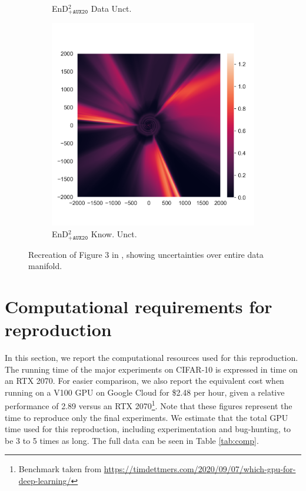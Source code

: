 \begin{figure}
\begin{subfigure}{0.22\textwidth}
  \caption{EnD$^2_{\texttt{+AUX20}}$ Data Unct.}
  \label{fig:3q}
\end{subfigure}%
\begin{subfigure}{0.22\textwidth}
  \centering
  \includegraphics[trim=42 45 15 55, clip, width=\linewidth]{plots/3s.png}
  \caption{EnD$^2_{\texttt{+AUX20}}$ Know. Unct.}
  \label{fig:3r}
\end{subfigure}%

\caption{Recreation of Figure 3 in \cite{malinin2019ensemble}, showing uncertainties over entire data manifold.}
\label{fig:fig3}
\end{figure}





\section{Computational requirements for reproduction}

In this section, we report the computational resources used for this reproduction. The running time of the major experiments on CIFAR-10 is expressed in time on an RTX 2070. For easier comparison, we also report the equivalent cost when running on a V100 GPU on Google Cloud for \$2.48 per hour, given a relative performance of 2.89 versus an RTX 2070\footnote{Benchmark taken from \url{https://timdettmers.com/2020/09/07/which-gpu-for-deep-learning/}}. Note that these figures represent the time to reproduce only the final experiments. We estimate that the total GPU time used for this reproduction, including experimentation and bug-hunting, to be 3 to 5 times as long. The full data can be seen in Table \ref{tab:comp}. 


